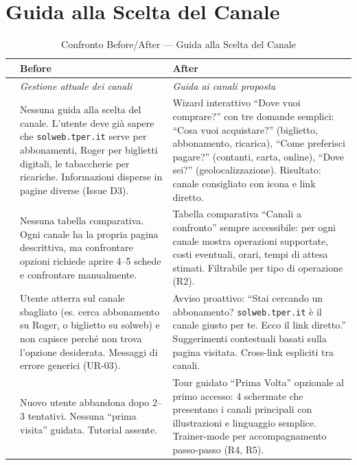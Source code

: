 \documentclass[11pt,a4paper]{article}
\begin{document}
\vspace{0.3cm}

\section{Guida alla Scelta del Canale}

\begin{table}[H]
\centering
\small
\renewcommand{\arraystretch}{1.4}
\begin{tabular}{|p{0.5cm}|p{7cm}|p{7cm}|}
\hline
& \textbf{Before} & \textbf{After} \\ \hline
\cellcolor{primaryColor!15} &
\textit{Gestione attuale dei canali} &
\textit{Guida ai canali proposta} \\ \hline

\raisebox{0.5cm}{\rotatebox{90}{\textbf{Orientamento}}} &
Nessuna guida alla scelta del canale. L'utente deve gi\`a sapere che \texttt{solweb.tper.it} serve per abbonamenti, Roger per biglietti digitali, le tabaccherie per ricariche. Informazioni disperse in pagine diverse (Issue D3). &
Wizard interattivo ``Dove vuoi comprare?'' con tre domande semplici: ``Cosa vuoi acquistare?'' (biglietto, abbonamento, ricarica), ``Come preferisci pagare?'' (contanti, carta, online), ``Dove sei?'' (geolocalizzazione). Risultato: canale consigliato con icona e link diretto. \\ \hline

\raisebox{0.5cm}{\rotatebox{90}{\textbf{Confronto}}} &
Nessuna tabella comparativa. Ogni canale ha la propria pagina descrittiva, ma confrontare opzioni richiede aprire 4--5 schede e confrontare manualmente. &
Tabella comparativa ``Canali a confronto'' sempre accessibile: per ogni canale mostra operazioni supportate, costi eventuali, orari, tempi di attesa stimati. Filtrabile per tipo di operazione (R2). \\ \hline

\raisebox{0.5cm}{\rotatebox{90}{\textbf{Errori}}} &
Utente atterra sul canale sbagliato (es. cerca abbonamento su Roger, o biglietto su solweb) e non capisce perch\'e non trova l'opzione desiderata. Messaggi di errore generici (UR-03). &
Avviso proattivo: ``Stai cercando un abbonamento? \texttt{solweb.tper.it} \`e il canale giusto per te. Ecco il link diretto.'' Suggerimenti contestuali basati sulla pagina visitata. Cross-link espliciti tra canali. \\ \hline

\raisebox{0.5cm}{\rotatebox{90}{\textbf{Nuovi utenti}}} &
Nuovo utente abbandona dopo 2--3 tentativi. Nessuna ``prima visita'' guidata. Tutorial assente. &
Tour guidato ``Prima Volta'' opzionale al primo accesso: 4 schermate che presentano i canali principali con illustrazioni e linguaggio semplice. Trainer-mode per accompagnamento passo-passo (R4, R5). \\ \hline
\end{tabular}
\caption{Confronto Before/After --- Guida alla Scelta del Canale}
\label{tab:comp-channels}
\end{table}
\end{document}

